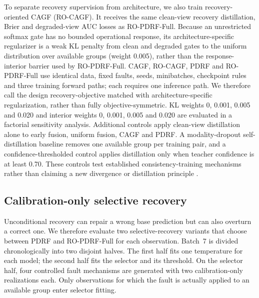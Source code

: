 \documentclass[11pt]{article}
\begin{document}
To separate recovery supervision from architecture, we also train recovery-oriented CAGF (RO-CAGF). It receives the same clean-view recovery distillation, Brier and degraded-view AUC losses as RO-PDRF-Full. Because an unrestricted softmax gate has no bounded operational response, its architecture-specific regularizer is a weak KL penalty from clean and degraded gates to the uniform distribution over available groups (weight 0.005), rather than the response-interior barrier used by RO-PDRF-Full. CAGF, RO-CAGF, PDRF and RO-PDRF-Full use identical data, fixed faults, seeds, minibatches, checkpoint rules and three training forward paths; each requires one inference path. We therefore call the design recovery-objective matched with architecture-specific regularization, rather than fully objective-symmetric. KL weights 0, 0.001, 0.005 and 0.020 and interior weights 0, 0.001, 0.005 and 0.020 are evaluated in a factorial sensitivity analysis. Additional controls apply clean-view distillation alone to early fusion, uniform fusion, CAGF and PDRF. A modality-dropout self-distillation baseline removes one available group per training pair, and a confidence-thresholded control applies distillation only when teacher confidence is at least 0.70. These controls test established consistency-training mechanisms rather than claiming a new divergence or distillation principle \citep{neverova2016moddrop,li2024umdf}.

\subsection{Calibration-only selective recovery}

Unconditional recovery can repair a wrong base prediction but can also overturn a correct one. We therefore evaluate two selective-recovery variants that choose between PDRF and RO-PDRF-Full for each observation. Batch~7 is divided chronologically into two disjoint halves. The first half fits one temperature for each model; the second half fits the selector and its threshold. On the selector half, four controlled fault mechanisms are generated with two calibration-only realizations each. Only observations for which the fault is actually applied to an available group enter selector fitting.
\end{document}
